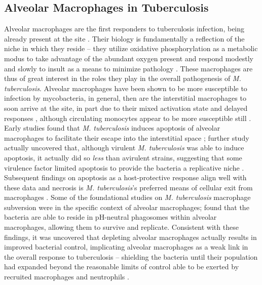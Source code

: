 \subsection{Alveolar Macrophages in Tuberculosis}\label{alvmac}

Alveolar macrophages are the first responders to tuberculosis infection, being already present at the site \citep{Flynn2001}. Their biology is fundamentally a reflection of the niche in which they reside -- they utilize oxidative phosphorylation as a metabolic modus to take advantage of the abundant oxygen present and respond modestly and slowly to insult as a means to minimize pathology \citep{Joshi2018}. These macrophages are thus of great interest in the roles they play in the overall pathogenesis of \textit{M. tuberculosis}. Alveolar macrophages have been shown to be more susceptible to infection by mycobacteria, in general, then are the interstitial macrophages to soon arrive at the site, in part due to their mixed activation state and delayed responses \citep{Kahnert2006, Madden2022}, although circulating monocytes appear to be more susceptible still \citep{Cambier2014b, Cambier2017}. Early studies found that \textit{M. tuberculosis} induces apoptosis of alveolar macrophages to facilitate their escape into the interstitial space \citep{Keane1997}; further study actually uncovered that, although virulent \textit{M. tuberculosis} was able to induce apoptosis, it actually did so \textit{less} than avirulent strains, suggesting that some virulence factor limited apoptosis to provide the bacteria a replicative niche \citep{Keane2000, Cohen2018}. Subsequent findings on apoptosis as a host\hyp{}protective response align well with these data and necrosis is \textit{M. tuberculosis}'s preferred means of cellular exit from macrophages \citep{Behar2011}. Some of the foundational studies on \textit{M. tuberculosis} macrophage subversion were in the specific context of alveolar macrophages; \citet{Mwandumba2004} found that the bacteria are able to reside in pH\hyp{}neutral phagosomes within alveolar macrophages, allowing them to survive and replicate. Consistent with these findings, it was uncovered that depleting alveolar macrophages actually results in improved bacterial control, implicating alveolar macrophages as a weak link in the overall response to tuberculosis -- shielding the bacteria until their population had expanded beyond the reasonable limits of control able to be exerted by recruited macrophages and neutrophils \citep{Leemans2001}. 

